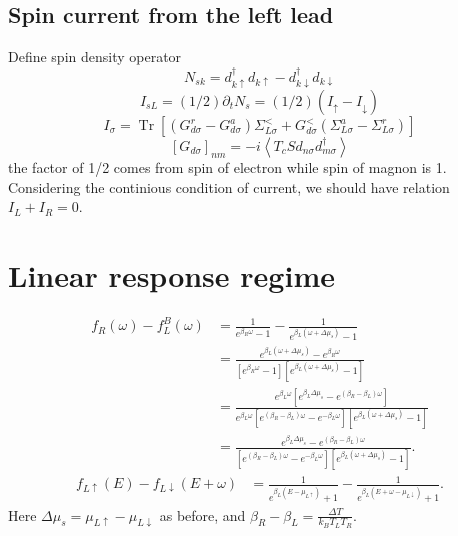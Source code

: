\documentclass[aps,prb,onecolumn,amssymb,amsmath,superscriptaddress]{revtex4-1}
\begin{document}
\subsection{Spin current from the left lead}
Define spin density operator
\begin{equation}
N_{sk} = d_{k \uparrow}^{\dagger} d_{k \uparrow}-d_{k \downarrow}^{\dagger} d_{k \downarrow}
\end{equation}
\begin{equation}
I_{s L}=(1 / 2) \partial_{t} N_{s}=(1 / 2)\left(I_{\uparrow}-I_{\downarrow}\right)
\end{equation}
\begin{equation}
I_{\sigma}=\operatorname{Tr}\left[\left(G_{d \sigma}^{r}-G_{d \sigma}^{a}\right) \Sigma_{L \sigma}^{<}+G_{d \sigma}^{<}\left(\Sigma_{L \sigma}^{a}-\Sigma_{L \sigma}^{r}\right)\right]
\end{equation}
\begin{equation}
\left[G_{d \sigma}\right]_{n m}=-i\left\langle T_{c} S d_{n \sigma} d_{m \sigma}^{\dagger}\right\rangle
\end{equation}
the factor of 1/2 comes from spin of electron while spin of magnon is 1. Considering the continious condition of current, we should have relation $I_{L} + I_{R} = 0$.

\section{Linear response regime}
\begin{equation}\label{eq:fupdown0}
\begin{split}
f_{R}(\omega)-f_{L}^{B}(\omega) &= \frac{1}{e^{\beta_{R}\omega}-1} - \frac{1}{e^{\beta_{L}(\omega+\Delta\mu_{s})}-1} \\
&= \frac{e^{\beta_{L}(\omega+\Delta\mu_{s})} - e^{\beta_{R}\omega}}{[e^{\beta_{R}\omega}-1][e^{\beta_{L}(\omega+\Delta\mu_{s})}-1]} \\
&= \frac{e^{\beta_{L}\omega}[e^{\beta_{L}\Delta\mu_{s}} - e^{(\beta_{R}-\beta_{L})\omega}]}{e^{\beta_{L}\omega}[e^{(\beta_{R}-\beta_{L})\omega}-e^{-\beta_{L}\omega}][e^{\beta_{L}(\omega+\Delta\mu_{s})}-1]} \\
&= \frac{e^{\beta_{L}\Delta\mu_{s}} - e^{(\beta_{R}-\beta_{L})\omega}}{[e^{(\beta_{R}-\beta_{L})\omega}-e^{-\beta_{L}\omega}][e^{\beta_{L}(\omega+\Delta\mu_{s})}-1]}.
\end{split}
\end{equation}
\begin{equation}
\begin{split}
f_{L\uparrow}(E)-f_{L\downarrow}(E+\omega) &= \frac{1}{e^{\beta_{L}(E-\mu_{L\uparrow})}+1} - \frac{1}{e^{\beta_{L}(E+\omega-\mu_{L\downarrow})}+1}.
\end{split}
\end{equation}
Here $\Delta\mu_{s} = \mu_{L\uparrow} - \mu_{L\downarrow}$ as before, and $\beta_{R}-\beta_L = \frac{\Delta T}{k_{B}T_{L}T_{R}}$. 
\end{document}
